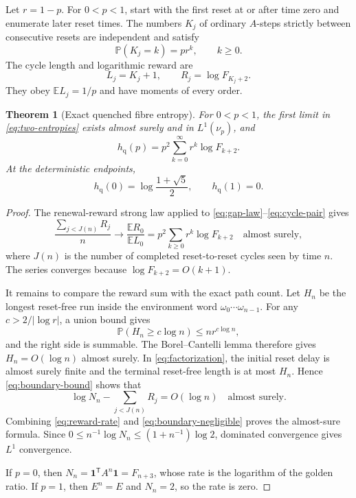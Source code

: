\documentclass[11pt,a4paper]{amsart}
\newtheorem{theorem}{Theorem}[section]
\theoremstyle{definition}
\theoremstyle{remark}
\newcommand{\Prob}{\mathbb P}
\newcommand{\Exp}{\mathbb E}
\newcommand{\one}{\mathbf 1}
\newcommand{\hq}{h_{\mathrm q}}
\begin{document}
Let $r=1-p$.  For $0<p<1$, start with the first reset at or after time zero
and enumerate later reset times.  The numbers $K_j$ of ordinary $A$-steps
strictly between consecutive resets are independent and satisfy
\begin{equation}\label{eq:gap-law}
 \Prob(K_j=k)=p r^k,
 \qquad k\geq0.
\end{equation}
The cycle length and logarithmic reward are
\begin{equation}\label{eq:cycle-pair}
 L_j=K_j+1,
 \qquad
 R_j=\log F_{K_j+2}.
\end{equation}
They obey $\Exp L_j=1/p$ and have moments of every order.

\begin{theorem}[Exact quenched fibre entropy]\label{thm:quenched}
For $0<p<1$, the first limit in \eqref{eq:two-entropies} exists almost
surely and in $L^1(\nu_p)$, and
\begin{equation}\label{eq:quenched-formula}
 \boxed{\displaystyle
 \hq(p)=p^2\sum_{k=0}^{\infty}r^k\log F_{k+2}.}
\end{equation}
At the deterministic endpoints,
\begin{equation}\label{eq:quenched-endpoints}
 \hq(0)=\log\frac{1+\sqrt5}{2},
 \qquad \hq(1)=0.
\end{equation}
\end{theorem}

\begin{proof}
The renewal-reward strong law applied to \eqref{eq:gap-law}--\eqref{eq:cycle-pair}
gives
\begin{equation}\label{eq:reward-rate}
 \frac{\sum_{j<J(n)}R_j}{n}
 \longrightarrow
 \frac{\Exp R_0}{\Exp L_0}
 =p^2\sum_{k\geq0}r^k\log F_{k+2}
 \quad\text{almost surely},
\end{equation}
where $J(n)$ is the number of completed reset-to-reset cycles seen by time
$n$.  The series converges because $\log F_{k+2}=O(k+1)$.

It remains to compare the reward sum with the exact path count.  Let $H_n$
be the longest reset-free run inside the environment word
$\omega_0\cdots\omega_{n-1}$.  For any
$c>2/|\log r|$, a union bound gives
\[
 \Prob(H_n\geq c\log n)\leq n r^{c\log n},
\]
and the right side is summable.  The Borel--Cantelli lemma therefore gives
$H_n=O(\log n)$ almost surely.  In \eqref{eq:factorization}, the initial
reset delay is almost surely finite and the terminal reset-free length is at
most $H_n$.  Hence \eqref{eq:boundary-bound} shows that
\begin{equation}\label{eq:boundary-negligible}
 \log N_n-\sum_{j<J(n)}R_j=O(\log n)
 \quad\text{almost surely}.
\end{equation}
Combining \eqref{eq:reward-rate} and \eqref{eq:boundary-negligible} proves
the almost-sure formula.  Since
$0\leq n^{-1}\log N_n\leq(1+n^{-1})\log2$, dominated convergence gives
$L^1$ convergence.

If $p=0$, then $N_n=\one^{\mathsf T}A^n\one=F_{n+3}$, whose rate is the
logarithm of the golden ratio.  If $p=1$, then $E^n=E$ and $N_n=2$, so the
rate is zero.
\end{proof}
\end{document}
